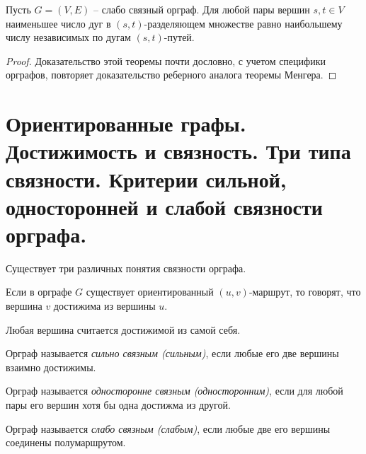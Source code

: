 \begin{theorem}
    Пусть $ G = (V,E) $ -- слабо связный орграф. Для любой пары вершин $ s,t \in V $ наименьшее число дуг в $ (s,t) $-разделяющем множестве равно наибольшему числу независимых по дугам $ (s,t) $-путей.
\end{theorem}

\begin{proof}
    Доказательство этой теоремы почти дословно, с учетом специфики орграфов, повторяет доказательство реберного аналога теоремы Менгера.
\end{proof}

\section{Ориентированные графы. Достижимость и связность. Три типа связности. Критерии сильной, односторонней и слабой связности орграфа.}

\begin{note}
    Существует три различных понятия связности орграфа.
\end{note}

\begin{definition}
    Если в орграфе $ G $ существует ориентированный $ (u,v) $-маршрут, то говорят, что вершина $ v $ достижима из вершины $ u $.
\end{definition}

\begin{note}
    Любая вершина считается достижимой из самой себя.
\end{note}

\begin{definition}
    Орграф называется \emph{сильно связным (сильным)}, если любые его две вершины взаимно достижимы.
\end{definition}

\begin{definition}
    Орграф называется \emph{односторонне связным (односторонним)}, если для любой пары его вершин хотя бы одна достижма из другой.
\end{definition}

\begin{definition}
    Орграф называется \emph{слабо связным (слабым)}, если любые две его вершины соединены полумаршрутом.
\end{definition}


